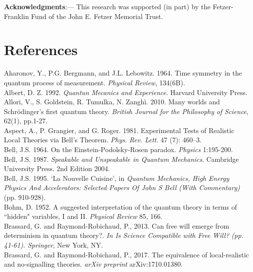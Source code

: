 \documentclass[12pt]{article}
\begin{document}
\textbf{Acknowledgments}:---  This research was supported (in part) by the Fetzer-Franklin Fund of the John E. Fetzer Memorial Trust.

\section{References}
\indent

Aharonov, Y., P.G. Bergmann, and J.L. Lebowitz. 1964. Time symmetry in the quantum process of measurement. \textit{Physical Review}, 134(6B).\\

Albert, D. Z. 1992. \textit{Quantun Mecanics and Experience}. Harvard University Press. \\

Allori, V., S. Goldstein, R. Tumulka, N. Zanghì. 2010. Many worlds and Schrödinger’s first quantum theory. \textit{British Journal for the Philosophy of Science}, 62(1), pp.1-27.\\


Aspect, A., P. Grangier, and G. Roger. 1981. Experimental Tests of Realistic Local Theories via Bell's Theorem. \textit{Phys. Rev. Lett}. 47 (7): 460–3.\\

Bell, J.S. 1964. On the Einstein-Podolsky-Rosen paradox. \textit{Physics} 1:195-200.\\

Bell, J.S. 1987. \textit{Speakable and Unspeakable in Quantum Mechanics}. Cambridge University Press. 2nd Edition 2004.\\

Bell, J.S. 1995. `La Nouvelle Cuisine', in \textit{Quantum Mechanics, High Energy Physics And Accelerators: Selected Papers Of John S Bell (With Commentary)} (pp. 910-928).\\

Bohm, D. 1952. A suggested interpretation of the quantum theory in terms of ``hidden" variables, I and II. \textit{Physical Review} 85, 166.\\

Brassard, G. and Raymond-Robichaud, P., 2013. Can free will emerge from determinism in quantum theory?. \textit{In Is Science Compatible with Free Will? (pp. 41-61). Springer}, New York, NY.\\

Brassard, G. and Raymond-Robichaud, P., 2017. The equivalence of local-realistic and no-signalling theories. \textit{arXiv preprint} arXiv:1710.01380.\\
\end{document}
